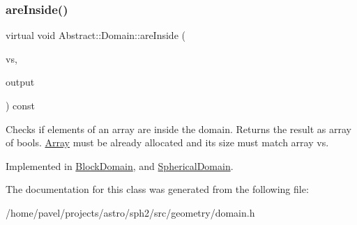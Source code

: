 \subsubsection{\texorpdfstring{are\+Inside()}{areInside()}}
{\footnotesize\ttfamily virtual void Abstract\+::\+Domain\+::are\+Inside (\begin{DoxyParamCaption}\item[{const \hyperlink{classArrayView}{Array\+View}$<$ \hyperlink{classBasicVector}{Vector} $>$}]{vs,  }\item[{\hyperlink{classArrayView}{Array\+View}$<$ bool $>$}]{output }\end{DoxyParamCaption}) const\hspace{0.3cm}{\ttfamily [pure virtual]}}

Checks if elements of an array are inside the domain. Returns the result as array of bools. \hyperlink{classArray}{Array} must be already allocated and its size must match array vs. 

Implemented in \hyperlink{classBlockDomain_a2dba56e9bbecdc5954147accfdcf331b}{Block\+Domain}, and \hyperlink{classSphericalDomain_aa5f4f17ecc1fa454da8b30e55bba98bf}{Spherical\+Domain}.



The documentation for this class was generated from the following file\+:\begin{DoxyCompactItemize}
\item 
/home/pavel/projects/astro/sph2/src/geometry/domain.\+h\end{DoxyCompactItemize}
